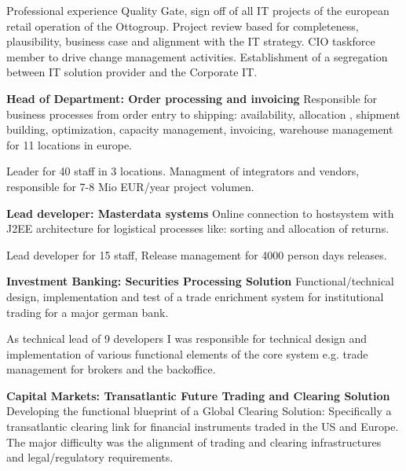 \begin{rubric}{Professional experience}
Quality Gate, sign off of all IT projects of the european retail operation of the Ottogroup. Project review based for completeness, plausibility, business case and alignment with the IT strategy. CIO taskforce member to drive change management activities. Establishment of a segregation between IT solution provider and the Corporate IT.

\entry*[08/2006 - 07/2009] \textbf{Head of Department: Order processing and invoicing}\newline
{} 
Responsible for business processes from order entry to shipping: availability, allocation , shipment building, optimization, capacity management, invoicing, warehouse management for 11 locations in europe.\axelvspace

Leader for 40 staff in 3 locations. Managment of integrators and vendors, responsible for 7-8 Mio EUR/year project volumen.

\entry*[01/2005 - 07/2006] \textbf{Lead developer: Masterdata systems}\newline
{} 
Online connection to hostsystem with J2EE architecture for logistical processes like: sorting and allocation of returns.\axelvspace

Lead developer for 15 staff, Release management for 4000 person days releases.

\entry*[10/2003 - 12/2004] \textbf{Investment Banking: Securities Processing Solution}\newline
{} 
Functional/technical design, implementation and test of a trade enrichment system for institutional trading for a major german bank.\axelvspace

As technical lead of 9 developers I was responsible for technical design and implementation of various functional elements of the core system e.g. trade management for brokers and the backoffice. 

\entry*[07/2003 - 10/2003] \textbf{Capital Markets: Transatlantic Future Trading and Clearing Solution}\newline
{} 
Developing the functional blueprint of a Global Clearing Solution: Specifically a transatlantic clearing link for financial instruments traded in the US and Europe. The major difficulty was the alignment of trading and clearing infrastructures and legal/regulatory requirements.


\end{rubric}
